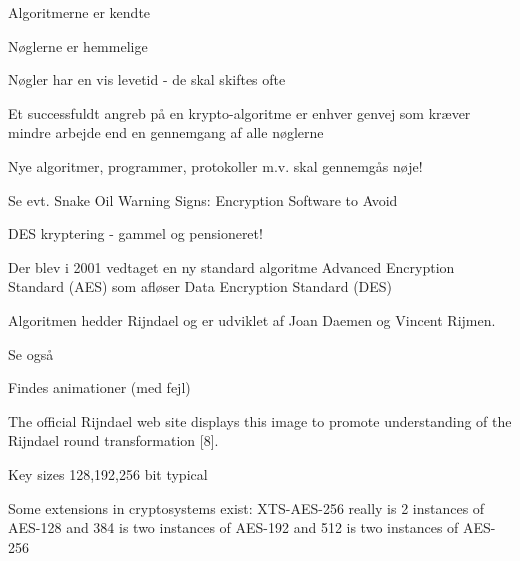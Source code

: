\documentclass[Screen16to9,17pt]{foils}
\begin{document}

\begin{list1}
\item Algoritmerne er kendte
\item Nøglerne er hemmelige
\item Nøgler har en vis levetid - de skal skiftes ofte
\item Et successfuldt angreb på en krypto-algoritme er enhver genvej
  som kræver mindre arbejde end en gennemgang af alle nøglerne
\item Nye algoritmer, programmer, protokoller m.v. skal gennemgås nøje!
\item Se evt. Snake Oil Warning Signs:
Encryption Software to Avoid\\
\end{list1}




\begin{list1}
\item DES kryptering - gammel og pensioneret!
\item Der blev i 2001 vedtaget en ny standard algoritme Advanced Encryption
  Standard (AES) som afløser Data Encryption Standard (DES)
\item Algoritmen hedder Rijndael og er udviklet
af Joan Daemen og Vincent Rijmen.
\item Se også 
\item Findes animationer (med fejl) 
\end{list1}



\begin{list2}
\item The official Rijndael web site displays this image to promote understanding of the Rijndael round transformation [8].
\item Key sizes 128,192,256 bit typical
\item Some extensions in cryptosystems exist: XTS-AES-256 really is 2 instances of AES-128 and 384 is two instances of AES-192 and 512 is two instances of AES-256
\item {}
\end{list2}
\end{document}
